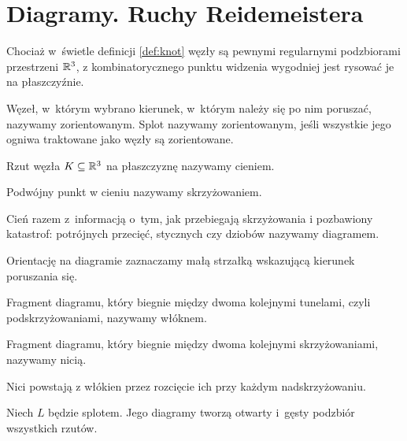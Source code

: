 \section{Diagramy. Ruchy Reidemeistera}
Chociaż w~świetle definicji \ref{def:knot} węzły są pewnymi regularnymi podzbiorami przestrzeni $\mathbb R^3$,
z kombinatorycznego punktu widzenia wygodniej jest rysować je na płaszczyźnie.

\begin{definition}[orientacja]
    Węzeł, w~którym wybrano kierunek, w~którym należy się po nim poruszać, nazywamy zorientowanym.
    Splot nazywamy zorientowanym, jeśli wszystkie jego ogniwa traktowane jako węzły są zorientowane.
\end{definition}

\begin{definition}
    Rzut węzła $K \subseteq \mathbb R^3$ na płaszczyznę nazywamy cieniem.
\end{definition}

\begin{definition}[skrzyżowanie]
    Podwójny punkt w cieniu nazywamy skrzyżowaniem.
\end{definition}

\begin{definition}[diagram]
    \label{def_diagrams}
    Cień razem z~informacją o~tym, jak przebiegają skrzyżowania i pozbawiony katastrof: potrójnych przecięć, stycznych czy dziobów nazywamy diagramem.
\end{definition}

Orientację na diagramie zaznaczamy małą strzałką wskazującą kierunek poruszania się.

\begin{definition}[włókno]
    Fragment diagramu, który biegnie między dwoma kolejnymi tunelami, czyli podskrzyżowaniami, nazywamy włóknem.
\end{definition}

\begin{definition}[nić]
    Fragment diagramu, który biegnie między dwoma kolejnymi skrzyżowaniami, nazywamy nicią.
\end{definition}

Nici powstają z włókien przez rozcięcie ich przy każdym nadskrzyżowaniu.

\begin{proposition}
    Niech $L$ będzie splotem.
    Jego diagramy tworzą otwarty i~gęsty podzbiór wszystkich rzutów.
\end{proposition}


